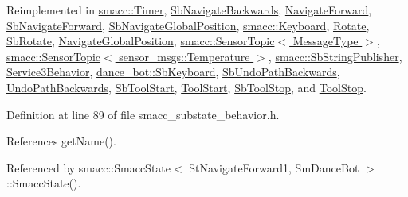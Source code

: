 Reimplemented in \hyperlink{classsmacc_1_1Timer_ab99111438ad35cf740ed4bd8c136ff6a}{smacc\+::\+Timer}, \hyperlink{classSbNavigateBackwards_a59b7bc4f0b714f548c73659c87dd405e}{Sb\+Navigate\+Backwards}, \hyperlink{classNavigateForward_a2a1ad66b031773aeac11663020afebba}{Navigate\+Forward}, \hyperlink{classSbNavigateForward_a0e01d850ed0e028f3b9b3704862c7ea5}{Sb\+Navigate\+Forward}, \hyperlink{classSbNavigateGlobalPosition_ae4c1f2e5de1077ee88d506eb69099f0c}{Sb\+Navigate\+Global\+Position}, \hyperlink{classsmacc_1_1Keyboard_afd90aca9ae741a0648e273b70771ac1d}{smacc\+::\+Keyboard}, \hyperlink{classRotate_ab07f79966ab172e454139c4139adf51b}{Rotate}, \hyperlink{classSbRotate_adb33f70659313834da495c294e2eafeb}{Sb\+Rotate}, \hyperlink{classNavigateGlobalPosition_a80962ce5bba51285565e360872f58c47}{Navigate\+Global\+Position}, \hyperlink{classsmacc_1_1SensorTopic_a27fe3515e3981a5a393dea193902cbd0}{smacc\+::\+Sensor\+Topic$<$ Message\+Type $>$}, \hyperlink{classsmacc_1_1SensorTopic_a27fe3515e3981a5a393dea193902cbd0}{smacc\+::\+Sensor\+Topic$<$ sensor\+\_\+msgs\+::\+Temperature $>$}, \hyperlink{classsmacc_1_1SbStringPublisher_adde036f7d11370ec44ed418c2734b60a}{smacc\+::\+Sb\+String\+Publisher}, \hyperlink{classService3Behavior_a914618fa7f8152868204543838cd8359}{Service3\+Behavior}, \hyperlink{classdance__bot_1_1SbKeyboard_a26f2b4191ab58f32be4d41ffb74b6005}{dance\+\_\+bot\+::\+Sb\+Keyboard}, \hyperlink{classSbUndoPathBackwards_ab7eed4fa4633235b877758bd787bbea1}{Sb\+Undo\+Path\+Backwards}, \hyperlink{classUndoPathBackwards_a073a69a9e7b89d38faaab47096df292c}{Undo\+Path\+Backwards}, \hyperlink{classSbToolStart_a1f027da301c03b5114fc241c820dd56a}{Sb\+Tool\+Start}, \hyperlink{classToolStart_a23b54807a3d839a08a6031e67b341a4f}{Tool\+Start}, \hyperlink{classSbToolStop_a411f6a864d2d70be43bdedc0c7ce77ac}{Sb\+Tool\+Stop}, and \hyperlink{classToolStop_a1db01a6b333c6570cbad3495a483d452}{Tool\+Stop}.



Definition at line 89 of file smacc\+\_\+substate\+\_\+behavior.\+h.



References get\+Name().



Referenced by smacc\+::\+Smacc\+State$<$ St\+Navigate\+Forward1, Sm\+Dance\+Bot $>$\+::\+Smacc\+State().




